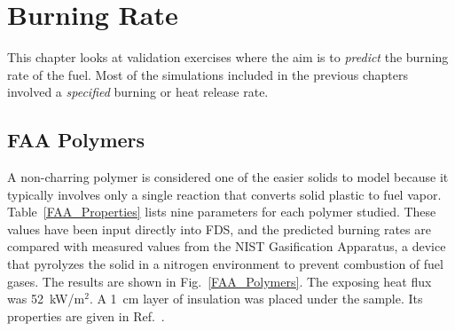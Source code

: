 
\chapter{Burning Rate}

This chapter looks at validation exercises where the aim is to {\em predict} the burning rate of the fuel. Most of the simulations included in the previous chapters involved
a {\em specified} burning or heat release rate.


\section{FAA Polymers}

A non-charring polymer is considered one of the easier solids to model because it typically involves only a single reaction that converts solid plastic to fuel vapor. Table~\ref{FAA_Properties}
lists nine parameters for each polymer studied. These values have been input directly into FDS, and the predicted burning rates are compared with measured values from the NIST
Gasification Apparatus, a device that pyrolyzes the solid in a nitrogen environment to prevent combustion of fuel gases. The results are shown in Fig.~\ref{FAA_Polymers}. The exposing
heat flux was 52~kW/m$^2$. A 1~cm layer of insulation was placed under the sample. Its properties are given in Ref.~\cite{Stoliarov:CF2009}.

